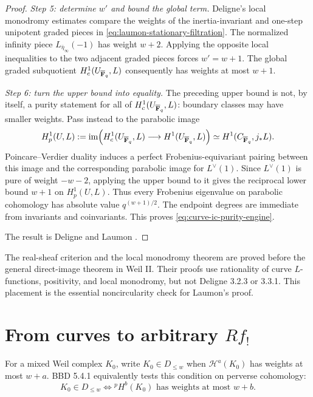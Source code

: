 \begin{proof}
\emph{Step 5: determine \(w'\) and bound the global term.}
Deligne's local monodromy estimates
\cite[\S1.8, especially Thm.~1.8.4]{DeligneWeilII} compare the weights of
the inertia-invariant and one-step unipotent graded pieces in
\eqref{eq:laumon-stationary-filtration}.  The normalized infinity piece
\(L_{\bar\eta_\infty}(-1)\) has weight \(w+2\).  Applying the opposite local
inequalities to the two adjacent graded pieces forces \(w'=w+1\).
The global graded subquotient \(H_c^1(U_{\overline{\mathbf F}_q},L)\) consequently has
weights at most \(w+1\).

\emph{Step 6: turn the upper bound into equality.}
The preceding upper bound is not, by itself, a purity statement for all of
\(H_c^1(U_{\overline{\mathbf F}_q},L)\): boundary classes may have smaller weights.  Pass
instead to the parabolic image
\[
 H_p^1(U,L):=\operatorname{im}\!\left(H_c^1(U_{\overline{\mathbf F}_q},L)
             \longrightarrow H^1(U_{\overline{\mathbf F}_q},L)\right)
 \simeq H^1(C_{\overline{\mathbf F}_q},j_*L).
\]
Poincare--Verdier duality induces a perfect Frobenius-equivariant pairing
between this image and the corresponding parabolic image for
\(L^\vee(1)\).  Since \(L^\vee(1)\) is pure of weight \(-w-2\), applying
the upper bound to it gives the reciprocal lower bound \(w+1\) on
\(H_p^1(U,L)\).  Thus every Frobenius eigenvalue on parabolic cohomology has
absolute value \(q^{(w+1)/2}\).  The endpoint degrees are immediate from
invariants and coinvariants.  This proves \eqref{eq:curve-ic-purity-engine}.

The result is Deligne \cite[Thm.~3.2.3]{DeligneWeilII} and Laumon
\cite[Thm.~4.1.3]{LaumonFourier}.
\end{proof}

\begin{remark}
The real-sheaf criterion and the local monodromy theorem are proved before
the general direct-image theorem in Weil II.  Their proofs use rationality
of curve \(L\)-functions, positivity, and local monodromy, but not
Deligne 3.2.3 or 3.3.1.  This placement is the essential noncircularity
check for Laumon's proof.
\end{remark}

\section{From curves to arbitrary \texorpdfstring{\(Rf_!\)}{Rf-shriek}}

For a mixed Weil complex \(K_0\), write \(K_0\in D_{\leq w}\) when
\(\mathcal H^a(K_0)\) has weights at most \(w+a\).  BBD 5.4.1 equivalently
tests this condition on perverse cohomology:
\[
 K_0\in D_{\leq w}
 \Longleftrightarrow
 {}^pH^b(K_0)\text{ has weights at most }w+b.
\tag{\thechapter.7}\label{eq:perverse-weight-test-engine}
\]

